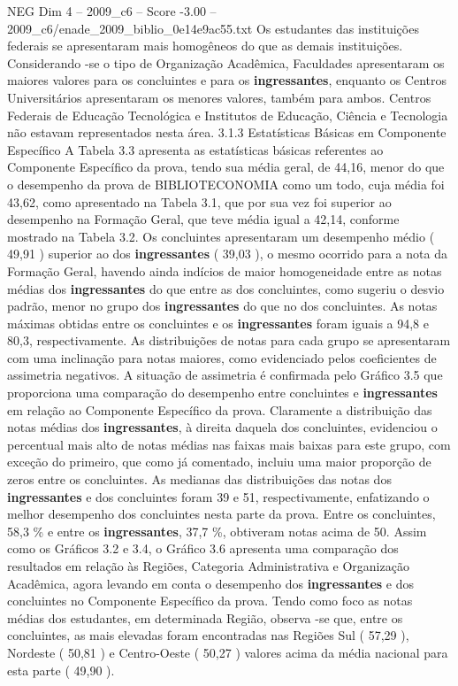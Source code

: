 \begin{textsample}{NEG Dim 4 – 2009\_c6 – Score -3.00 – 2009\_c6/enade\_2009\_biblio\_0e14e9ac55.txt}
Os estudantes das instituições federais se apresentaram mais homogêneos do que as demais instituições.
Considerando -se o tipo de Organização Acadêmica, Faculdades apresentaram os maiores valores para os concluintes e para os \textbf{ingressantes}, enquanto os Centros Universitários apresentaram os menores valores, também para ambos.
Centros Federais de Educação Tecnológica e Institutos de Educação, Ciência e Tecnologia não estavam representados nesta área. 3.1.3 Estatísticas Básicas em Componente Específico A Tabela 3.3 apresenta as estatísticas básicas referentes ao Componente Específico da prova, tendo sua média geral, de 44,16, menor do que o desempenho da prova de BIBLIOTECONOMIA como um todo, cuja média foi 43,62, como apresentado na Tabela 3.1, que por sua vez foi superior ao desempenho na Formação Geral, que teve média igual a 42,14, conforme mostrado na Tabela 3.2.
Os concluintes apresentaram um desempenho médio ( 49,91 ) superior ao dos \textbf{ingressantes} ( 39,03 ), o mesmo ocorrido para a nota da Formação Geral, havendo ainda indícios de maior homogeneidade entre as notas médias dos \textbf{ingressantes} do que entre as dos concluintes, como sugeriu o desvio padrão, menor no grupo dos \textbf{ingressantes} do que no dos concluintes.
As notas máximas obtidas entre os concluintes e os \textbf{ingressantes} foram iguais a 94,8 e 80,3, respectivamente.
As distribuições de notas para cada grupo se apresentaram com uma inclinação para notas maiores, como evidenciado pelos coeficientes de assimetria negativos.
A situação de assimetria é confirmada pelo Gráfico 3.5 que proporciona uma comparação do desempenho entre concluintes e \textbf{ingressantes} em relação ao Componente Específico da prova.
Claramente a distribuição das notas médias dos \textbf{ingressantes}, à direita daquela dos concluintes, evidenciou o percentual mais alto de notas médias nas faixas mais baixas para este grupo, com exceção do primeiro, que como já comentado, incluiu uma maior proporção de zeros entre os concluintes.
As medianas das distribuições das notas dos \textbf{ingressantes} e dos concluintes foram 39 e 51, respectivamente, enfatizando o melhor desempenho dos concluintes nesta parte da prova.
Entre os concluintes, 58,3 \% e entre os \textbf{ingressantes}, 37,7 \%, obtiveram notas acima de 50.
Assim como os Gráficos 3.2 e 3.4, o Gráfico 3.6 apresenta uma comparação dos resultados em relação às Regiões, Categoria Administrativa e Organização Acadêmica, agora levando em conta o desempenho dos \textbf{ingressantes} e dos concluintes no Componente Específico da prova.
Tendo como foco as notas médias dos estudantes, em determinada Região, observa -se que, entre os concluintes, as mais elevadas foram encontradas nas Regiões Sul ( 57,29 ), Nordeste ( 50,81 ) e Centro-Oeste ( 50,27 ) valores acima da média nacional para esta parte ( 49,90 ).

\end{textsample}
